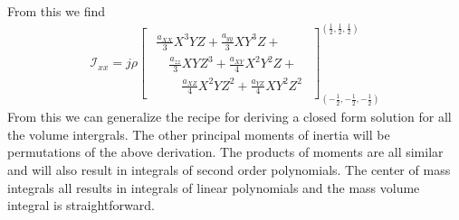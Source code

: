 \documentclass[twocolumn]{article}
\newcommand{\inertia}{\ensuremath{\mathcal{I} }}
\begin{document}
From this we find
\begin{subequations}
  \begin{align*}
    \inertia_{xx}
    =
    j \rho
    \begin{bmatrix}
      \begin{matrix}
        \frac{a_{XX}}{3} X^3 Y Z +\frac{a_{yy}}{3} X Y^3 Z +\\
        \quad \frac{a_{zz}}{3} X Y Z^3 +  \frac{a_{XY}}{4} X^2 Y^2  Z +\\
        \quad \quad         \frac{a_{XZ}}{4} X^2 Y  Z^2 + \frac{a_{YZ}}{4} X Y^2  Z^2
      \end{matrix}
    \end{bmatrix}_{ (-\frac{1}{2}, -\frac{1}{2}, -\frac{1}{2} ) } ^{ (
      \frac{1}{2}, \frac{1}{2}, \frac{1}{2})  }
  \end{align*}
\end{subequations}
From this we can generalize the recipe for deriving a closed form solution for
all the volume intergrals. The other principal moments of inertia will be
permutations of the above derivation. The products of moments are all similar
and will also result in integrals of second order polynomials. The center of
mass integrals all results in integrals of linear polynomials and the mass
volume integral is straightforward.






\end{document}
